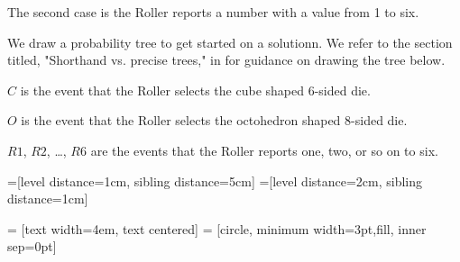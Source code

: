 \documentclass[a4paper,11pt]{article}
\begin{document}
The second case is the Roller reports a number with a value from
1 to six.

We draw a probability tree to get started on a solutionn.  We refer
to the section titled, "Shorthand vs. precise trees," in \cite{reading3}
for guidance on drawing the tree below.

$C$ is the event that the Roller selects the cube shaped $6$-sided die.

$O$ is the event that the Roller selects the octohedron shaped $8$-sided
die.

$R1$, $R2$, \ldots, $R6$ are the events that the Roller reports one, 
two, or so on to six.  

=[level distance=1cm, sibling distance=5cm]
=[level distance=2cm, sibling distance=1cm]

 = [text width=4em, text centered]
 = [circle, minimum width=3pt,fill, inner sep=0pt]

\begin{center}
\end{center}
\end{document}
